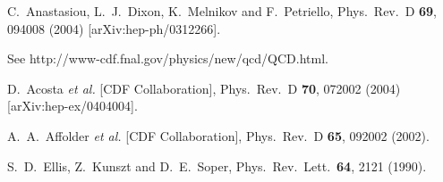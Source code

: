 \documentclass[12pt]{iopart}
\begin{document}
\begin{thebibliography}{99}


  C.~Anastasiou, L.~J.~Dixon, K.~Melnikov and F.~Petriello,
  Phys.\ Rev.\ D {\bf 69}, 094008 (2004)
  [arXiv:hep-ph/0312266].


 See http://www-cdf.fnal.gov/physics/new/qcd/QCD.html. 

  D.~Acosta {\it et al.}  [CDF Collaboration],
  Phys.\ Rev.\ D {\bf 70}, 072002 (2004)
  [arXiv:hep-ex/0404004].

\cite{Affolder:2001xt}
  A.~A.~Affolder {\it et al.}  [CDF Collaboration],
  Phys.\ Rev.\ D {\bf 65}, 092002 (2002).


  S.~D.~Ellis, Z.~Kunszt and D.~E.~Soper,
  Phys.\ Rev.\ Lett.\  {\bf 64}, 2121 (1990).


\end{thebibliography}
\end{document}
